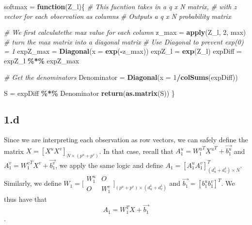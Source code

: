 \documentclass[12pt,halfline,a4paper,]{ouparticle}
\newenvironment{Shaded}{\begin{snugshade}}{\end{snugshade}}
\newcommand{\AttributeTok}[1]{\textcolor[rgb]{0.13,0.29,0.53}{#1}}
\newcommand{\CommentTok}[1]{\textcolor[rgb]{0.56,0.35,0.01}{\textit{#1}}}
\newcommand{\ControlFlowTok}[1]{\textcolor[rgb]{0.13,0.29,0.53}{\textbf{#1}}}
\newcommand{\DecValTok}[1]{\textcolor[rgb]{0.00,0.00,0.81}{#1}}
\newcommand{\FunctionTok}[1]{\textcolor[rgb]{0.13,0.29,0.53}{\textbf{#1}}}
\newcommand{\NormalTok}[1]{#1}
\newcommand{\OtherTok}[1]{\textcolor[rgb]{0.56,0.35,0.01}{#1}}
\newcommand{\SpecialCharTok}[1]{\textcolor[rgb]{0.81,0.36,0.00}{\textbf{#1}}}
\begin{document}
\begin{Shaded}
\begin{Highlighting}[]
\NormalTok{softmax }\OtherTok{=} \ControlFlowTok{function}\NormalTok{(Z\_l)\{}
  \CommentTok{\# This fucntion takes in a q x N matrix,}
  \CommentTok{\# with z vector for each observation as columns}
  \CommentTok{\# Outputs a q x N probability matrix}
  
  \CommentTok{\# We first calculatethe max value for each column}
\NormalTok{  z\_max }\OtherTok{=} \FunctionTok{apply}\NormalTok{(Z\_l, }\DecValTok{2}\NormalTok{, max)}
  \CommentTok{\# turn the max matrix into a diagonal matrix}
  \CommentTok{\# Use Diagonal to prevent exp(0) = 1}
\NormalTok{  expZ\_max }\OtherTok{=} \FunctionTok{Diagonal}\NormalTok{(}\AttributeTok{x =} \FunctionTok{exp}\NormalTok{(}\SpecialCharTok{{-}}\NormalTok{z\_max))}
\NormalTok{  expZ\_l }\OtherTok{=} \FunctionTok{exp}\NormalTok{(Z\_l)}
\NormalTok{  expDiff }\OtherTok{=}\NormalTok{ expZ\_l }\SpecialCharTok{\%*\%}\NormalTok{ expZ\_max}
  
  \CommentTok{\# Get the denominators }
\NormalTok{  Denominator }\OtherTok{=} \FunctionTok{Diagonal}\NormalTok{(}\AttributeTok{x =} \DecValTok{1}\SpecialCharTok{/}\FunctionTok{colSums}\NormalTok{(expDiff))}
  
\NormalTok{  S }\OtherTok{=}\NormalTok{ expDiff }\SpecialCharTok{\%*\%}\NormalTok{ Denominator}
  \FunctionTok{return}\NormalTok{(}\FunctionTok{as.matrix}\NormalTok{(S))}
\NormalTok{\}}
\end{Highlighting}
\end{Shaded}

\subsection*{1.d}\label{d}

Since we are interpreting each observation as row vectors, we can safely
define the matrix \(X = [X^u X^v]_{N \times (p^u + p^v)}\). In that
case, recall that \(A_1^u = {W_1^u}^T {X^u}^T + \vec{b_1^u}\) and
\(A_1^v = {W_1^v}^TX^v + \vec{b_1^v}\), we apply the same logic and
define \(A_1 = [A_1^u A_1^v]^T_{(d^1_u + d^1_v)\times N}\). Similarly,
we define \(W_1 = \big[\begin{smallmatrix}
  W_1^u & O\\
  O & W_1^v
\end{smallmatrix}\big]_{(p^u + p^v) \times (d^1_u + d^1_v)}\) and
\(\vec{b_1} = [b_1^u b_1^v]^T\). We thus have that
\[A_1 = W_1^TX + \vec{b_1}\].
\end{document}
